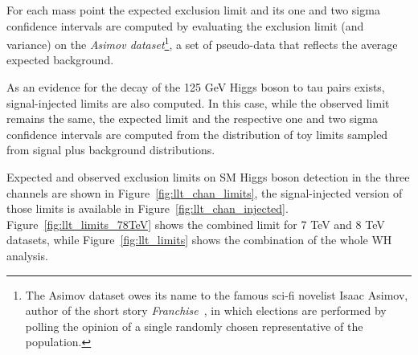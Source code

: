 For each mass point the expected exclusion limit and its one and two sigma confidence intervals are computed  by evaluating the exclusion limit (and variance) on the \emph{Asimov dataset}\footnote{The Asimov dataset owes its name to the famous sci-fi novelist Isaac Asimov, author of the short story \emph{Franchise}~\cite{franchise}, in which elections are performed by polling the opinion of a single randomly chosen representative of the population.}, a set of pseudo-data that reflects the average expected background. 

As an evidence for the decay of the 125 GeV Higgs boson to tau pairs exists, signal-injected limits are also computed. In this case, while the observed limit remains the same, the expected limit and the respective one and two sigma confidence intervals are computed from the distribution of toy limits sampled from signal plus background distributions.

Expected and observed exclusion limits on SM Higgs boson detection in the three channels are shown in Figure~\ref{fig:llt_chan_limits}, the signal-injected version of those limits is available in Figure~\ref{fig:llt_chan_injected}. Figure~\ref{fig:llt_limits_78TeV} shows the combined limit for 7 TeV and 8 TeV datasets, while Figure~\ref{fig:llt_limits} shows the combination of the whole WH analysis.

